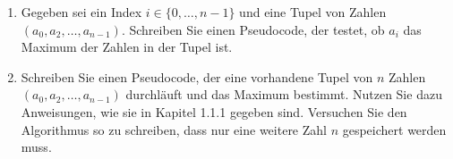 \begin{enumerate}
	\item Gegeben sei ein Index $i \in \lbrace 0, \dots, n-1\rbrace$ und eine Tupel von Zahlen  $( a_0, a_2, \dots, a_{n-1})$. Schreiben Sie einen Pseudocode, der testet, ob $a_i$ das Maximum
	der Zahlen in der Tupel ist.
	\item Schreiben Sie einen Pseudocode, der eine vorhandene Tupel von $n$ Zahlen $( a_0, a_2, \dots, a_{n-1})$ durchläuft und das Maximum bestimmt. 
	Nutzen Sie dazu Anweisungen, wie sie in Kapitel 1.1.1 gegeben sind.
	Versuchen Sie den Algorithmus so zu schreiben, dass nur eine weitere Zahl $n$ gespeichert werden muss.
\end{enumerate}

